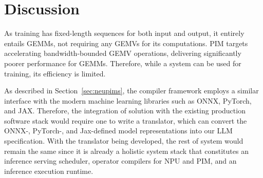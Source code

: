 \section{Discussion}
\label{sec:discuss}

As training has fixed-length sequences for both input and output, it entirely entails GEMMs, not requiring any GEMVs for its computations. PIM targets accelerating bandwidth-bounded GEMV operations, delivering significantly poorer performance for GEMMs. Therefore, while a \neupims system can be used for training, its efficiency is limited.

%
As described in Section~\ref{sec:neupims}, the \neupims compiler framework employs a similar interface with the modern machine learning libraries such as ONNX, PyTorch, and JAX.
%
Therefore, the integration of \neupims solution with the existing production software stack would require one to write a translator, which can convert the ONNX-, PyTorch-, and Jax-defined model representations into our LLM specification.
%
With the translator being developed, the rest of \neupims system would remain the same since it is already a holistic system stack that constitutes an inference serving scheduler, operator compilers for NPU and PIM, and an inference execution runtime.
%